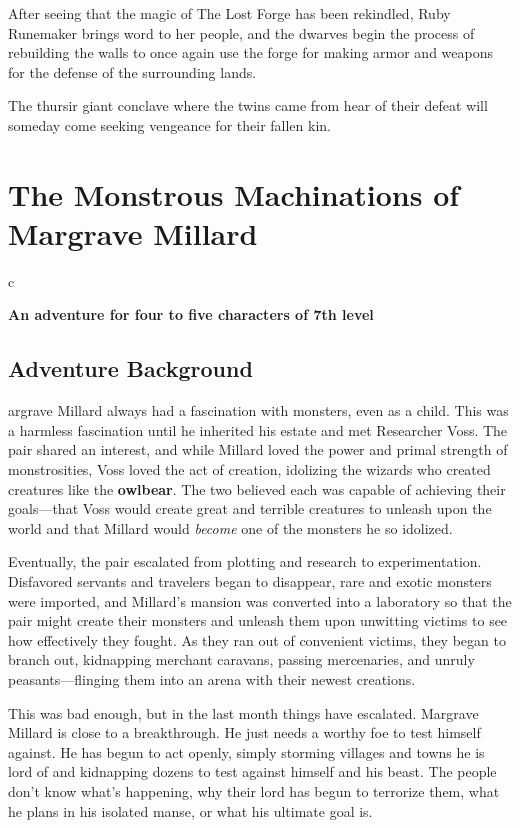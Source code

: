\documentclass[10pt,a4paper,twoside,bg=print,twocolumn,openany,nodeprecatedcode]{dndbook}
\begin{document}
After seeing that the magic of The Lost Forge has been rekindled, Ruby Runemaker brings word to her people, and the dwarves begin the process of rebuilding the walls to once again use the forge for making armor and weapons for the defense of the surrounding lands.

The thursir giant conclave where the twins came from hear of their defeat will someday come seeking vengeance for their fallen kin.

\chapter{The Monstrous Machinations of Margrave Millard}

\begin{DndTable}{c}

\textbf{An adventure for four to five characters of 7th level}\\
\end{DndTable}

\section{Adventure Background}
argrave Millard always had a fascination with monsters, even as a child. This was a harmless fascination until he inherited his estate and met Researcher Voss. The pair shared an interest, and while Millard loved the power and primal strength of monstrosities, Voss loved the act of creation, idolizing the wizards who created creatures like the \textbf{owlbear}. The two believed each was capable of achieving their goals—that Voss would create great and terrible creatures to unleash upon the world and that Millard would \textit{become} one of the monsters he so idolized.


Eventually, the pair escalated from plotting and research to experimentation. Disfavored servants and travelers began to disappear, rare and exotic monsters were imported, and Millard's mansion was converted into a laboratory so that the pair might create their monsters and unleash them upon unwitting victims to see how effectively they fought. As they ran out of convenient victims, they began to branch out, kidnapping merchant caravans, passing mercenaries, and unruly peasants—flinging them into an arena with their newest creations.

This was bad enough, but in the last month things have escalated. Margrave Millard is close to a breakthrough. He just needs a worthy foe to test himself against. He has begun to act openly, simply storming villages and towns he is lord of and kidnapping dozens to test against himself and his beast. The people don't know what's happening, why their lord has begun to terrorize them, what he plans in his isolated manse, or what his ultimate goal is.
\end{document}
